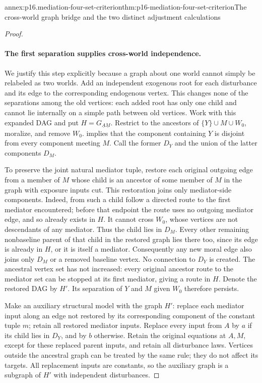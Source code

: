 \begin{annexitem}{annex:p16.mediation-four-set-criterion}{thm:p16-mediation-four-set-criterion}{The cross-world graph bridge and the two distinct adjustment calculations}
\begin{proof}
\paragraph{The first separation supplies cross-world independence.}
We justify this step explicitly because a graph about one world cannot
simply be relabeled as two worlds. Add an independent exogenous root for
each disturbance and its edge to the corresponding endogenous vertex.
This changes none of the separations among the old vertices: each added
root has only one child and cannot lie internally on a simple path between
old vertices. Work with this expanded DAG and put
\(H=G_{\underline A\underline M}\). Restrict to the ancestors of
\(\{Y\}\cup M\cup W_0\), moralize, and remove \(W_0\).
 implies that the component containing \(Y\)
is disjoint from every component meeting \(M\). Call the former
\(D_Y\) and the union of the latter components \(D_M\).

To preserve the joint natural mediator tuple, restore each original
outgoing edge from a member of \(M\) whose child is an ancestor of
some member of \(M\) in the graph with exposure inputs cut. This
restoration joins only mediator-side components. Indeed, from such a
child follow a directed route to the first mediator encountered; before
that endpoint the route uses no outgoing mediator edge, and so already
exists in \(H\). It cannot cross \(W_0\), whose vertices are not
descendants of any mediator. Thus the child lies in \(D_M\). Every
other remaining nonbaseline parent of that child in the restored graph
lies there too, since its edge is already in \(H\), or it is itself a mediator. Consequently any
new moral edge also joins only \(D_M\) or a removed baseline vertex.
No connection to \(D_Y\) is created. The ancestral vertex set has
not increased: every original ancestor route to the mediator set can
be stopped at its first mediator, giving a route in \(H\). Denote
the restored DAG by \(H'\). Its separation of \(Y\) and \(M\)
given \(W_0\) therefore persists.

Make an auxiliary structural model with the graph \(H'\): replace each
mediator input along an edge not restored by its corresponding component
of the constant tuple \(m\); retain all restored mediator inputs. Replace
every input from \(A\) by \(a\) if its child lies in \(D_Y\), and
by \(b\) otherwise. Retain the original equations at \(A,M\), except
for these replaced parent inputs, and retain all disturbance laws.
Vertices outside the ancestral graph can be treated by the same rule;
they do not affect its targets. All replacement inputs are constants,
so the auxiliary graph is a subgraph of \(H'\) with independent
disturbances.


\end{proof}
\end{annexitem}
